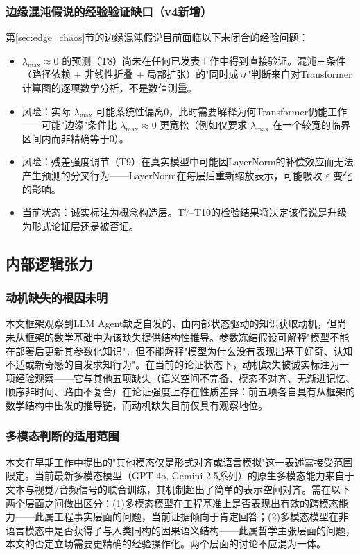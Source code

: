 \documentclass[11pt,a4paper]{article}
\theoremstyle{definition}
\begin{document}
\subsubsection{边缘混沌假说的经验验证缺口（v4新增）}
\label{sec:open_edge_chaos}

第\ref{sec:edge_chaos}节的边缘混沌假说目前面临以下未闭合的经验问题：
\begin{itemize}[leftmargin=*,itemsep=0.2em]
    \item $\lambda_{\max} \approx 0$ 的预测（T8）尚未在任何已发表工作中得到直接验证。混沌三条件（路径依赖 + 非线性折叠 + 局部扩张）的"同时成立"判断来自对Transformer计算图的逐项数学分析，不是数值测量。
    \item 风险：实际 $\lambda_{\max}$ 可能系统性偏离0，此时需要解释为何Transformer仍能工作——可能"边缘"条件比 $\lambda_{\max} \approx 0$ 更宽松（例如仅要求 $\lambda_{\max}$ 在一个较宽的临界区间内而非精确等于0）。
    \item 风险：残差强度调节（T9）在真实模型中可能因LayerNorm的补偿效应而无法产生预测的分叉行为——LayerNorm在每层后重新缩放表示，可能吸收 $\varepsilon$ 变化的影响。
    \item 当前状态：诚实标注为概念构造层。T7--T10的检验结果将决定该假说是升级为形式论证层还是被否证。
\end{itemize}

\subsection{内部逻辑张力}

\subsubsection{动机缺失的根因未明}

本文框架观察到LLM Agent缺乏自发的、由内部状态驱动的知识获取动机，但尚未从框架的数学基础中为该缺失提供结构性推导。参数冻结假设可解释"模型不能在部署后更新其参数化知识"，但不能解释"模型为什么没有表现出基于好奇、认知不适或新奇感的自发求知行为"。在当前的论证状态下，动机缺失被诚实标注为一项经验观察——它与其他五项缺失（语义空间不完备、模态不对齐、无渐进记忆、顺序非时间、路由不复合）在论证强度上存在性质差异：前五项各自具有从框架的数学结构中出发的推导链，而动机缺失目前仅具有观察地位。

\subsubsection{多模态判断的适用范围}

本文在早期工作中提出的"其他模态仅是形式对齐或语言模拟"这一表述需接受范围限定。当前最新多模态模型（GPT-4o, Gemini 2.5系列）的原生多模态能力来自于文本与视觉/音频信号的联合训练，其机制超出了简单的表示空间对齐。需在以下两个层面之间做出区分：(1)多模态模型在工程基准上是否表现出有效的跨模态能力——此属工程事实层面的问题，当前证据倾向于肯定回答；(2)多模态模型在非语言模态中是否获得了与人类同构的因果语义结构——此属哲学主张层面的问题，本文的否定立场需要更精确的经验操作化。两个层面的讨论不应混为一体。
\end{document}
